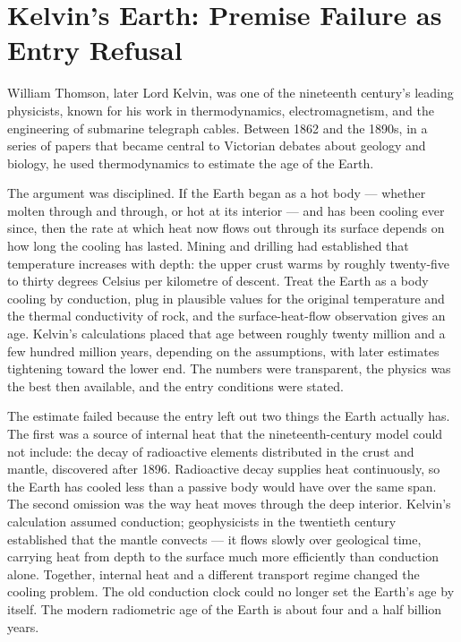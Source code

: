 \section{Kelvin's Earth: Premise Failure as Entry Refusal}

William Thomson, later Lord Kelvin, was one of the nineteenth century's
leading physicists, known for his work in thermodynamics,
electromagnetism, and the engineering of submarine telegraph cables.
Between 1862 and the 1890s, in a series of papers that became central to
Victorian debates about geology and biology, he used thermodynamics to
estimate the age of the Earth.

The argument was disciplined. If the Earth began as a hot body --- whether
molten through and through, or hot at its interior --- and has been
cooling ever since, then the rate at which heat now flows out through its
surface depends on how long the cooling has lasted. Mining and drilling
had established that temperature increases with depth: the upper crust
warms by roughly twenty-five to thirty degrees Celsius per kilometre of
descent. Treat the Earth as a body cooling by conduction, plug in
plausible values for the original temperature and the thermal conductivity
of rock, and the surface-heat-flow observation gives an age. Kelvin's
calculations placed that age between roughly twenty million and a few
hundred million years, depending on the assumptions, with later estimates
tightening toward the lower end. The numbers were transparent, the
physics was the best then available, and the entry conditions were
stated.

The estimate failed because the entry left out two things the Earth
actually has. The first was a source of internal heat that the
nineteenth-century model could not include: the decay of radioactive
elements distributed in the crust and mantle, discovered after 1896.
Radioactive decay supplies heat continuously, so the Earth has cooled
less than a passive body would have over the same span. The second
omission was the way heat moves through the deep interior. Kelvin's
calculation assumed conduction; geophysicists in the twentieth century
established that the mantle convects --- it flows slowly over geological
time, carrying heat from depth to the surface much more efficiently than
conduction alone. Together, internal heat and a different transport regime
changed the cooling problem. The old conduction clock could no longer set
the Earth's age by itself. The modern radiometric age of the Earth is
about four and a half billion years.

